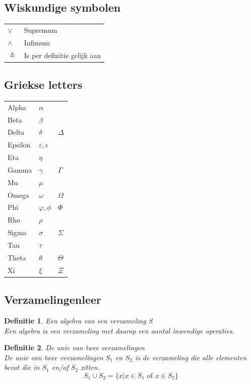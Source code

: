 \documentclass[a4paper]{article}
\newtheorem{tdefinitie}{Definitie}[section]
\newenvironment{definitie}[1]%
  {\begin{mdframed}[backgroundcolor=silver,
    topline=false,
    rightline=false,
    leftline=false,
    bottomline=false]\begin{tdefinitie}#1\\\normalfont}%
  {\end{tdefinitie}\end{mdframed}}
\newcommand{\of}{\ensuremath{\text{ of }}}
\begin{document}
\subsection{Wiskundige symbolen}

\begin{tabular}{l|l}
	$\vee$ & Supremum \\
	$\wedge$ & Infimum \\
	$\triangleq$ & Is per definitie gelijk aan \\
\end{tabular}

\subsection{Griekse letters}

\begin{tabular}{l|l|l}
	Alpha & $\alpha$ & \\
	Beta & $\beta$ & \\
	Delta & $\delta$ & $\Delta$ \\
	Epsilon & $\varepsilon, \epsilon$ & \\
	Eta & $\eta$ & \\
	Gamma & $\gamma$ & $\Gamma$ \\
	Mu & $\mu$ & \\
	Omega & $\omega$ & $\Omega$ \\
	Phi & $\varphi, \phi$ & $\Phi$ \\
	Rho & $\rho$ & \\
	Sigma & $\sigma$ & $\Sigma$ \\
	Tau & $\tau$ & \\
	Theta & $\theta$ & $\Theta$ \\
	Xi & $\xi$ & $\Xi$ \\
\end{tabular}

\subsection{Verzamelingenleer}

\begin{definitie}{Een algebra van een verzameling S}
Een algebra is een verzameling met daarop een aantal inwendige operaties.
\end{definitie}

\begin{definitie}{De unie van twee verzamelingen}
  De unie van twee verzamelingen $S_1$ en $S_2$ is de verzameling die alle elementen bevat die in $S_1$ en/of $S_2$ zitten.
  \begin{equation*}
  S_1 \cup S_2 = \{x|x \in S_1 \of x \in S_2\}
  \end{equation*}
\end{definitie}
\end{document}
